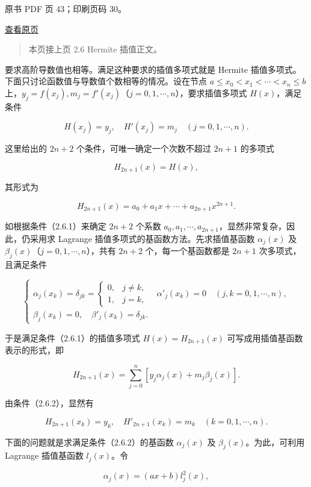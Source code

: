 \clearpage

原书 PDF 页 43；印刷页码 30。

\href{source-images/pdf-043.jpeg}{查看原页}

\begin{quote}
本页接上页 2.6 Hermite 插值正文。
\end{quote}

要求高阶导数值也相等。满足这种要求的插值多项式就是 Hermite 插值多项式。下面只讨论函数值与导数值个数相等的情况。设在节点 \(a\leqslant x_0<x_1<\cdots<x_n\leqslant b\) 上，\(y_j=f(x_j),m_j=f'(x_j)\)（\(j=0,1,\cdots,n\)），要求插值多项式 \(H(x)\)，满足条件

\[
H(x_j)=y_j,\quad H'(x_j)=m_j\quad(j=0,1,\cdots,n).\tag{2.6.1}
\]

这里给出的 \(2n+2\) 个条件，可唯一确定一个次数不超过 \(2n+1\) 的多项式

\[H_{2n+1}(x)=H(x),\]

其形式为

\[H_{2n+1}(x)=a_0+a_1x+\cdots+a_{2n+1}x^{2n+1}.\]

如根据条件（2.6.1）来确定 \(2n+2\) 个系数 \(a_0,a_1,\cdots,a_{2n+1}\)，显然非常复杂，因此，仍采用求 Lagrange 插值多项式的基函数方法。先求插值基函数 \(\alpha_j(x)\) 及 \(\beta_j(x)\)（\(j=0,1,\cdots,n\)），共有 \(2n+2\) 个，每一个基函数都是 \(2n+1\) 次多项式，且满足条件

\[
\begin{cases}
\alpha_j(x_k)=\delta_{jk}=\begin{cases}0,&j\ne k,\\1,&j=k,\end{cases}\quad \alpha'_j(x_k)=0\quad(j,k=0,1,\cdots,n),\\
\beta_j(x_k)=0,\quad \beta'_j(x_k)=\delta_{jk}.
\end{cases}\tag{2.6.2}
\]

于是满足条件（2.6.1）的插值多项式 \(H(x)=H_{2n+1}(x)\) 可写成用插值基函数表示的形式，即

\[H_{2n+1}(x)=\sum_{j=0}^{n}[y_j\alpha_j(x)+m_j\beta_j(x)].\tag{2.6.3}\]

由条件（2.6.2），显然有

\[H_{2n+1}(x_k)=y_k,\quad H'_{2n+1}(x_k)=m_k\quad(k=0,1,\cdots,n).\]

下面的问题就是求满足条件（2.6.2）的基函数 \(\alpha_j(x)\) 及 \(\beta_j(x)\)。为此，可利用 Lagrange 插值基函数 \(l_j(x)\)。令

\[\alpha_j(x)=(ax+b)l_j^2(x),\]

